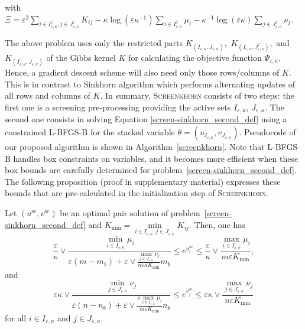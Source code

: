 with $\Xi = \varepsilon^2 \sum_{i \in I^\complement_{\varepsilon,\kappa}, j \in J^\complement_{\varepsilon,\kappa}} K_{ij} -\kappa \log(\varepsilon\kappa^{-1})\sum_{i \in I^\complement_{\varepsilon,\kappa}}\mu_i - \kappa^{-1} \log(\varepsilon\kappa)\sum_{j\in J^\complement_{\varepsilon,\kappa}} \nu_j$.

 The above problem uses only the restricted parts $K_{(I_{\varepsilon,\kappa}, J_{\varepsilon,\kappa})},$ $K_{(I_{\varepsilon,\kappa}, J^\complement_{\varepsilon,\kappa})},$ and $K_{(I^\complement_{\varepsilon,\kappa}, J_{\varepsilon,\kappa})}$ of the Gibbs kernel $K$ for calculating the objective function $\Psi_{\varepsilon, \kappa}$. Hence, a gradient descent scheme will also need only those rows/columns of $K$. This is in contrast to Sinkhorn algorithm which performs alternating updates of all rows and columns of $K$. In summary, \textsc{Screenkhorn} consists of two steps: the first one is a screening pre-processing providing the active sets $I_{\varepsilon,\kappa}$, $J_{\varepsilon,\kappa}$. 
The second one consists in solving Equation \eqref{screen-sinkhorn_second_def}
using a constrained L-BFGS-B \cite{byrd1995L-BFGS-B} for the stacked variable $\theta=(u_{I_{\varepsilon,\kappa}},v_{J_{\varepsilon,\kappa}}).$ 
Pseudocode of our proposed algorithm is shown in Algorithm~\ref{screenkhorn}. %
Note that L-BFGS-B handles box constraints on variables, and it becomes more efficient when these box bounds are carefully determined for problem~\eqref{screen-sinkhorn_second_def}. 
The following proposition (proof in supplementary material) expresses these bounds that are pre-calculated in the initialization step of \textsc{Screenkhorn}.
\begin{proposition}
\label{prop:bounds_of_usc_and_vsc}
Let $(u^{\text{sc}}, v^{\text{sc}})$ be an optimal pair solution of problem~\eqref{screen-sinkhorn_second_def} and $K_{\min} = \min\limits_{i\in I_{\varepsilon,\kappa},j \in J_{\varepsilon,\kappa}}K_{ij}$. Then,
one has
\begin{equation}
\label{bound_on_u}
\frac \varepsilon\kappa \vee \frac{\min_{i \in I_{\varepsilon,\kappa}}\mu_i}{\varepsilon (m- m_b) + \varepsilon \vee \frac{\max_{j\in J_{\varepsilon,\kappa}} \nu_j}{n\varepsilon\kappa K_{\min}} m_b} \leq e^{u^{\text{sc}}_i} \leq \frac \varepsilon\kappa\vee \frac{\max_{i \in I_{\varepsilon,\kappa}} \mu_i}{m\varepsilon K_{\min}},
\end{equation}
and
\begin{equation}
\label{bound_on_v}
\varepsilon\kappa \vee \frac{\min_{j \in J_{\varepsilon,\kappa}}\nu_j}{\varepsilon(n- n_b) + \varepsilon \vee \frac{\kappa\max_{i\in I_{\varepsilon,\kappa}} \mu_i}{m\varepsilon K_{\min} } n_b} \leq e^{v^{\text{sc}}_j} \leq \varepsilon\kappa \vee \frac{\max_{j \in J_{\varepsilon,\kappa}} \nu_j}{n\varepsilon K_{\min} }
\end{equation}
for all $i\in I_{\varepsilon,\kappa}$ and $j\in J_{\varepsilon,\kappa}$.
\end{proposition}

